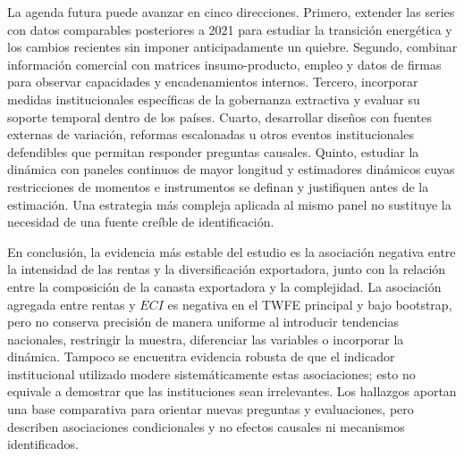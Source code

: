 \documentclass[../../TFM.tex]{subfiles}
\begin{document}
La agenda futura puede avanzar en cinco direcciones. Primero, extender las
series con datos comparables posteriores a 2021 para estudiar la transición
energética y los cambios recientes sin imponer anticipadamente un quiebre.
Segundo, combinar información comercial con matrices insumo-producto, empleo y
datos de firmas para observar capacidades y encadenamientos internos. Tercero,
incorporar medidas institucionales específicas de la gobernanza extractiva y
evaluar su soporte temporal dentro de los países. Cuarto, desarrollar diseños
con fuentes externas de variación, reformas escalonadas u otros eventos
institucionales defendibles que permitan responder preguntas causales. Quinto,
estudiar la dinámica con paneles continuos de mayor longitud y estimadores
dinámicos cuyas restricciones de momentos e instrumentos se definan y justifiquen
antes de la estimación. Una estrategia más compleja aplicada al mismo panel no
sustituye la necesidad de una fuente creíble de identificación.

En conclusión, la evidencia más estable del estudio es la asociación negativa
entre la intensidad de las rentas y la diversificación exportadora, junto con la
relación entre la composición de la canasta exportadora y la complejidad. La
asociación agregada entre rentas y $ECI$ es negativa en el TWFE principal y bajo
bootstrap, pero no conserva precisión de manera uniforme al introducir
tendencias nacionales, restringir la muestra, diferenciar las variables o
incorporar la dinámica. Tampoco se encuentra evidencia robusta de que el
indicador institucional utilizado modere sistemáticamente estas asociaciones;
esto no equivale a demostrar que las instituciones sean irrelevantes. Los
hallazgos aportan una base comparativa para orientar nuevas preguntas y
evaluaciones, pero describen asociaciones condicionales y no efectos causales ni
mecanismos identificados.

\end{document}
